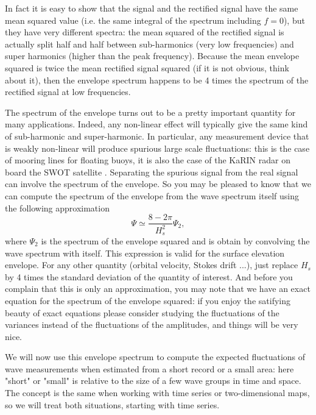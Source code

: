 {In fact it is easy to show that the signal and the rectified signal have the same mean squared value (i.e. the same integral of the spectrum including $f=0$), but they have very different spectra: the mean squared of the rectified signal is actually split half and half between sub-harmonics (very low frequencies) and super harmonics (higher than the peak frequency). Because the mean envelope squared is twice the mean rectified signal squared (if it is not obvious, think about it), then the envelope spectrum happens to be 4 times the spectrum of the rectified signal at low frequencies. 

The spectrum of the envelope turns out to be a pretty important quantity for many applications. Indeed, any non-linear effect will typically give the same kind of sub-harmonic and super-harmonic. In particular, any measurement device that is weakly non-linear will produce  spurious large scale fluctuations: this is the case of mooring lines for floating buoys, it is also the case of the KaRIN radar on board the SWOT satellite \citep{Peral&al.2015}. Separating the spurious signal from the real signal can involve the spectrum of the envelope. So you may be pleased to know that we can compute the spectrum of the envelope from the wave spectrum itself using the following approximation \citep{Tayfun&Lo1989}
\begin{equation}
    \Psi \simeq \frac{8 - 2\pi}{H_s^2}  \Psi_{2},
\label{eq:TayfunetLo}
\end{equation}
where $\Psi_2$ is the spectrum of the envelope squared and is obtain by convolving the wave spectrum with itself. This expression is valid for the surface elevation envelope. For any other quantity (orbital velocity, Stokes drift ...), just replace $H_s$ by 4 times the standard deviation of the quantity of interest. And before you complain that this is only an approximation, you may note that we have an exact equation for the spectrum of the envelope squared: if you enjoy the satifying beauty of exact equations please consider studying the fluctuations of the variances instead of the fluctuations of the amplitudes, and things will be very nice. 

We will now use this envelope spectrum to compute the expected fluctuations of wave measurements when estimated from a short record or a small area: here "short" or "small" is relative to the size of a few wave groups in time and space. The concept is the same when working with time series or two-dimensional maps, so we will treat both situations, starting with time series. 

}
